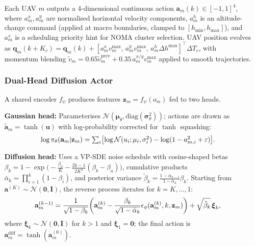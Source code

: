 \documentclass[journal]{IEEEtran}
\begin{document}
Each UAV $m$ outputs a 4-dimensional continuous action 
$\mathbf{a}_m(k)\in[-1,1]^4$, where $a_m^x, a_m^y$ are normalised 
horizontal velocity components, $a_m^h$ is an altitude-change command 
(applied at macro boundaries, clamped to $[h_{\min},h_{\max}]$), and 
$a_m^s$ is a scheduling priority hint for NOMA cluster selection. UAV 
position evolves as $\mathbf{q}_m(k{+}K_c) = \mathbf{q}_m(k) + 
[a_m^x v_m^{\max},\, a_m^y v_m^{\max},\, a_m^h \Delta h^{\max}]^\top 
\Delta T_c$, with momentum blending 
$\tilde{v}_m = 0.65\tilde{v}_m^{\mathrm{prev}} + 
0.35\,a_m^{x/y}v_m^{\max}$ applied to smooth trajectories.

\subsubsection{Dual-Head Diffusion Actor}

A shared encoder $f_\psi$ produces features $\mathbf{z}_m = f_\psi(o_m)$ 
fed to two heads.

\textbf{Gaussian head:} Parameterises 
$\mathcal{N}(\boldsymbol{\mu}_\theta,\mathrm{diag}(\boldsymbol{\sigma}_\theta^2))$; 
actions are drawn as $\tilde{\mathbf{a}}_m = \tanh(\mathbf{u})$ with 
log-probability corrected for $\tanh$ squashing:
\begin{equation}
\small
\log\pi_\theta(\mathbf{a}_m|\mathbf{z}_m)
= \textstyle\sum_i \bigl[\log\mathcal{N}(u_i;\mu_i,\sigma_i^2)
- \log(1 - a_{m,i}^2 + \varepsilon)\bigr].
\label{eq:log_prob_tanh}
\end{equation}

\textbf{Diffusion head:} Uses a VP-SDE noise schedule with 
cosine-shaped betas $\beta_k = 1 - \exp\!\bigl(-\tfrac{\beta_a}{K} - 
\tfrac{2k-1}{2K^2}(\beta_b{-}\beta_a)\bigr)$, cumulative products 
$\bar{\alpha}_k=\prod_{i=1}^k(1-\beta_i)$, and posterior variance 
$\tilde{\beta}_k = \tfrac{1-\bar{\alpha}_{k-1}}{1-\bar{\alpha}_k}\beta_k$.
Starting from $\mathbf{a}^{(K)}\!\sim\!\mathcal{N}(\mathbf{0},\mathbf{I})$, 
the reverse process iterates for $k=K,\dots,1$:
\begin{equation}
\small
\mathbf{a}_m^{(k-1)}
= \frac{1}{\sqrt{1-\beta_k}}
\!\left(\mathbf{a}_m^{(k)}
- \frac{\beta_k}{\sqrt{1-\bar{\alpha}_k}}
\epsilon_\phi(\mathbf{a}_m^{(k)}, k, \mathbf{z}_m)\right)
+ \sqrt{\tilde{\beta}_k}\,\boldsymbol{\xi}_k,
\label{eq:reverse_vpsde}
\end{equation}
where $\boldsymbol{\xi}_k\!\sim\!\mathcal{N}(\mathbf{0},\mathbf{I})$ 
for $k>1$ and $\boldsymbol{\xi}_1=\mathbf{0}$; the final action is 
$\mathbf{a}_m^{\mathrm{diff}}=\tanh(\mathbf{a}_m^{(0)})$.
\end{document}
